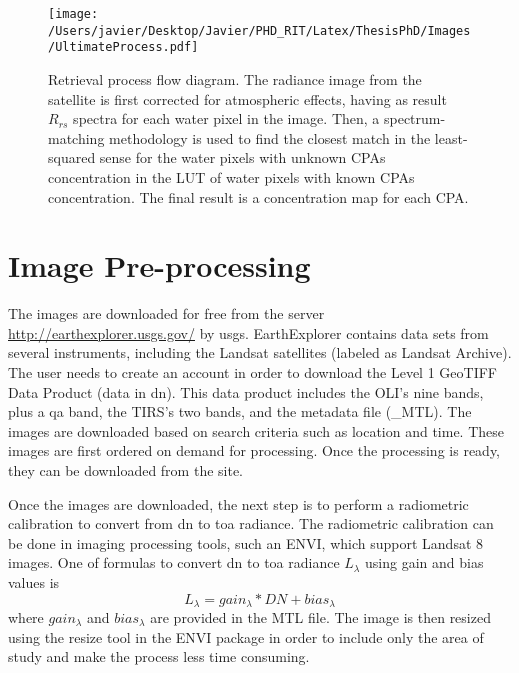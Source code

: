 \begin{figure}[htb]
  \centering
    \texttt{[image: /Users/javier/Desktop/Javier/PHD\_RIT/Latex/ThesisPhD/Images/UltimateProcess.pdf]}
    \caption{Retrieval process flow diagram. The radiance image from the satellite is first corrected for atmospheric effects, having as result $R_{rs}$ spectra for each water pixel in the image. Then, a spectrum-matching methodology is used to find the closest match in the least-squared sense for the water pixels with unknown CPAs concentration in the LUT of water pixels with known CPAs concentration. The final result is a concentration map for each CPA.  \label{fig:retrieval} }
\end{figure}
\section{Image Pre-processing} 
\label{sec:prepro}

The images are downloaded for free from the server \url{http://earthexplorer.usgs.gov/} by \gls{usgs}. EarthExplorer contains data sets from several instruments, including the Landsat satellites (labeled as Landsat Archive). The user needs to create an account in order to download the Level 1 GeoTIFF Data Product (data in \gls{dn}). This data product includes the OLI's nine bands, plus a \gls{qa} band, the TIRS's two bands, and the metadata file (\_MTL). The images are downloaded based on search criteria such as location and time. These images are first ordered on demand for processing. Once the processing is ready, they can be downloaded from the site.

Once the images are downloaded, the next step is to perform a radiometric calibration to convert from \gls{dn} to \gls{toa} radiance. The radiometric calibration can be done in imaging processing tools, such an ENVI, which support Landsat 8 images. One of formulas to convert \gls{dn} to \gls{toa} radiance $L_{\lambda}$ using gain and bias values is
\begin{equation}
  L_{\lambda} = gain_{\lambda}*DN+bias_{\lambda}
\end{equation}
\noindent where $gain_{\lambda}$ and $bias_{\lambda}$ are provided in the MTL file. The image is then resized using the resize tool in the ENVI package in order to include only the area of study and make the process less time consuming.

